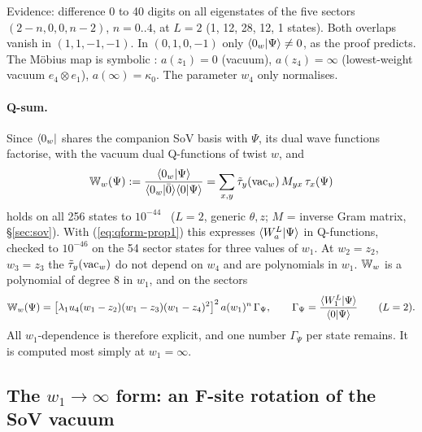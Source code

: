 \noindent Evidence: difference $0$ to 40 digits on all eigenstates of the five sectors $(2-n,0,0,n-2)$, $n=0..4$, at
$L=2$ (1, 12, 28, 12, 1 states). Both overlaps vanish in $(1,1,-1,-1)$. In $(0,1,0,-1)$ only $\langle0_w|\Psi\rangle\ne0$, as the
proof predicts. The M\"obius map is symbolic \ex: $a(z_1)=0$ (vacuum), $a(z_4)=\infty$ (lowest-weight vacuum
$e_4\otimes e_1$), $a(\infty)=\kappa_0$. The parameter $w_4$ only normalises.

\paragraph{Q-sum.} Since $\langle0_w|$ shares the companion SoV basis with $\Psi$, its dual wave functions factorise, with the
vacuum dual Q-functions of twist $w$, and
\begin{equation}
 \mathbb W_w(\Psi):=\frac{\langle0_w|\Psi\rangle}{\langle0_w|\bar0\rangle\langle0|\Psi\rangle}=\sum_{x,y}\tilde\tau_y(\mathrm{vac}_w)\,M_{yx}\,\tau_x(\Psi)
\end{equation}
holds on all 256 states to $10^{-44}$ \hp\ ($L=2$, generic $\theta,z$; $M$ = inverse Gram matrix, \S\ref{sec:sov}). With
(\ref{eq:qform-prop1}) this expresses $\langle W_a^L|\Psi\rangle$ in Q-functions, checked to $10^{-46}$ on the 54 sector states for
three values of $w_1$. At $w_2=z_2$, $w_3=z_3$ the $\tilde\tau_y(\mathrm{vac}_w)$ do not depend on $w_4$ and are polynomials in $w_1$.
$\mathbb W_w$ is a polynomial of degree 8 in $w_1$, and on the sectors \hp
\begin{equation}
 \mathbb W_w(\Psi)=\big[\lambda_1u_4(w_1-z_2)(w_1-z_3)(w_1-z_4)^2\big]^2\,a(w_1)^n\,\Gamma_\Psi,\qquad
 \Gamma_\Psi=\frac{\langle W_1^L|\Psi\rangle}{\langle0|\Psi\rangle}\qquad(L=2).
\end{equation}
All $w_1$-dependence is therefore explicit, and one number $\Gamma_\Psi$ per state remains. It is computed most simply at
$w_1=\infty$.

\subsection{The $w_1\to\infty$ form: an F-site rotation of the SoV vacuum}\label{sec:qform-winf}

